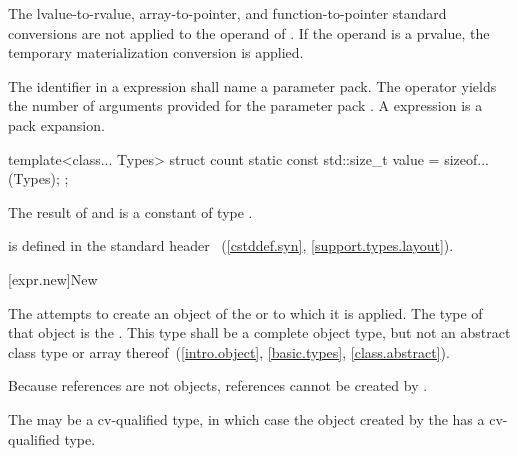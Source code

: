 \pnum
The lvalue-to-rvalue,
array-to-pointer, and
function-to-pointer standard conversions are not
applied to the operand of .
If the operand is a prvalue,
the temporary materialization conversion
is applied.

\pnum
The identifier in a  expression shall name a parameter
pack. The  operator yields the number of arguments
provided for the parameter pack .
A  expression is a pack expansion.
\begin{example}

\begin{codeblock}
template<class... Types>
struct count {
  static const std::size_t value = sizeof...(Types);
};
\end{codeblock}
\end{example}

\pnum
The result of  and  is a constant of type
.
\begin{note}
%
%
 is defined in the standard header
%
~(\ref{cstddef.syn}, \ref{support.types.layout}).
\end{note}

[expr.new]{New}

\pnum
{}%
%
%
%
%
The  attempts to create an object of the
 or  to which
it is applied. The type of that object is the .
%
This type shall be a complete object type, but not an abstract class
type or array
thereof~(\ref{intro.object}, \ref{basic.types}, \ref{class.abstract}).
\begin{note}
Because references are not objects, references cannot be created by
.
\end{note}
\begin{note}
The  may be a cv-qualified type, in which case the
object created by the  has a cv-qualified type.
\end{note}

